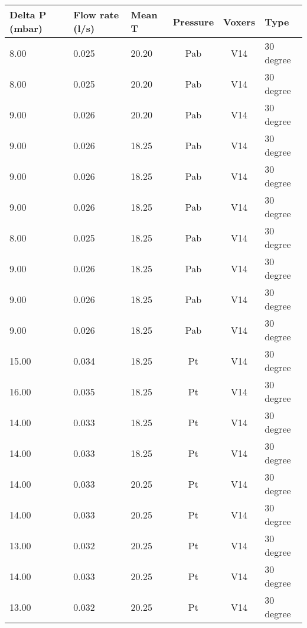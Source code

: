 \begin{table}[t]
\centering
\begin{tabular}{l | l | l | c | c | l}
Delta P (mbar) & Flow rate (l/s) & Mean T & Pressure & Voxers & Type                \\ \hline
8.00           & 0.025           & 20.20  & Pab      & V14    & 30 degree           \\
8.00           & 0.025           & 20.20  & Pab      & V14    & 30 degree           \\
9.00           & 0.026           & 20.20  & Pab      & V14    & 30 degree           \\
9.00           & 0.026           & 18.25  & Pab      & V14    & 30 degree           \\
9.00           & 0.026           & 18.25  & Pab      & V14    & 30 degree           \\
9.00           & 0.026           & 18.25  & Pab      & V14    & 30 degree           \\
8.00           & 0.025           & 18.25  & Pab      & V14    & 30 degree           \\
9.00           & 0.026           & 18.25  & Pab      & V14    & 30 degree           \\
9.00           & 0.026           & 18.25  & Pab      & V14    & 30 degree           \\
9.00           & 0.026           & 18.25  & Pab      & V14    & 30 degree           \\
15.00          & 0.034           & 18.25  & Pt       & V14    & 30 degree           \\
16.00          & 0.035           & 18.25  & Pt       & V14    & 30 degree           \\
14.00          & 0.033           & 18.25  & Pt       & V14    & 30 degree           \\
14.00          & 0.033           & 18.25  & Pt       & V14    & 30 degree           \\
14.00          & 0.033           & 20.25  & Pt       & V14    & 30 degree           \\
14.00          & 0.033           & 20.25  & Pt       & V14    & 30 degree           \\
13.00          & 0.032           & 20.25  & Pt       & V14    & 30 degree           \\
14.00          & 0.033           & 20.25  & Pt       & V14    & 30 degree           \\
13.00          & 0.032           & 20.25  & Pt       & V14    & 30 degree           \\

\end{tabular}
\end{table}
